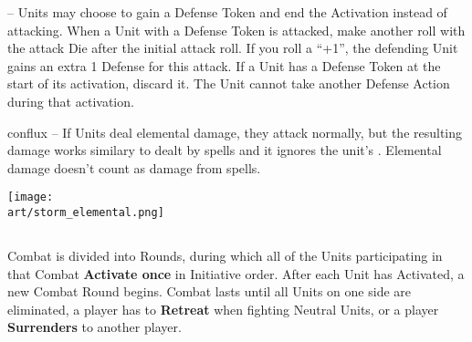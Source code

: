 \begin{multicols*}{2}
\textbf{}  – Units may choose to gain a Defense Token and end the Activation instead of attacking.
When a Unit with a Defense Token is attacked, make another roll with the attack Die after the initial attack roll.
If you roll a ``+1'', the defending Unit gains an extra 1 Defense for this attack.
If a Unit has a Defense Token at the start of its activation, discard it.
The Unit cannot take another Defense Action during that activation.\par
\begin{expansion}{conflux}\textbf{} – If Units deal elemental damage, they attack normally, but the resulting damage works similary to  dealt by spells and it ignores the unit's .
Elemental damage doesn't count as damage from spells.\end{expansion}


\vspace*{\fill}
\begin{center}
  \texttt{[image: \\art/storm\_elemental.png]}
\end{center}

\subsection*{}
Combat is divided into Rounds, during which all of the Units participating in that Combat \textbf{Activate once} in Initiative order.
After each Unit has Activated, a new Combat Round begins.
Combat lasts until all Units on one side are eliminated, a player has to \textbf{Retreat} when fighting Neutral Units, or a player \textbf{Surrenders} to another player.


\end{multicols*}
